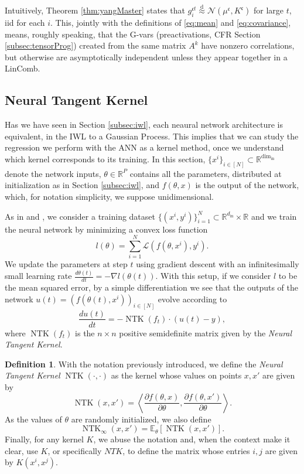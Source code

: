 \documentclass[11pt,notitlepage]{article}
\numberwithin{equation}{section}
\def\R{{\mathbb{R}}}
\def\normdist{\mathcal{N}}
\DeclareMathOperator{\NTK}{NTK}
\theoremstyle{remark}
\theoremstyle{definition}
\newtheorem{definition_body}[theorem]{Definition}
\newcommand{\definition}[1]{
	\theoremstyle{definition}
	\begin{definition_body}
		#1
	\end{definition_body}
	\theoremstyle{plain}
}
\begin{document}
	Intuitively, Theorem \ref{thm:yangMaster} states that $g_i^{\mathfrak{c}t} \stackrel{\text{d}}{\approx} \normdist(\mu^\mathfrak{c}, K^\mathfrak{c})$ for large $t$, iid for each $i$.
	This, jointly with the definitions of \eqref{eq:mean} and \eqref{eq:covariance}, means, roughly speaking, that the G-vars (preactivations, CFR Section \ref{subsec:tensorProg}) created from the same matrix $A^k$ have nonzero correlations, but otherwise are asymptotically independent unless they appear together in a LinComb.
	
	\subsection{Neural Tangent Kernel}\label{subsec:ntk}
	
	Has we have seen in Section \ref{subsec:iwl}, each neaural network architecture is equivalent, in the IWL to a Gaussian Process.
	This implies that we can study the regression we perform with the ANN as a kernel method, once we understand which kernel corresponds to its training.
	In this section, $\{x^i\}_{i\in [N]} \subset \R^{\text{dim}_\text{in}}$ denote the network inputs, $\theta \in \R^P$ contains all the parameters, distributed at initialization as in Section \ref{subsec:iwl}, and $f(\theta, x)$ is the output of the network, which, for notation simplicity, we suppose unidimensional.
	
	As in \cite{jacot2018neural} and \cite{arora2019exact}, we consider a training dataset $\{(x^i, y^i)\}_{i=1}^N \subset \R^{d_\text{in}} \times \R$ and we train the neural network by minimizing a convex loss function \[l(\theta) = \sum_{i=1}^N\mathcal{L}(f(\theta, x^i), y^i). \]
	We update the parameters at step $t$ using gradient descent with an infinitesimally small learning rate $\frac{d\theta(t)}{dt} = - \nabla l(\theta(t))$.
	With this setup, if we consider $l$ to be the mean squared error, by a simple differentiation \cite[Lemma 3.1]{arora2019exact} we see that the outputs of the network $u(t) = (f(\theta(t), x^i))_{i\in [N]}$ evolve according to 
	\begin{equation}\label{eq:dynamics}
		\frac{du(t)}{dt} = -\NTK(f_t) \cdot (u(t) - y),
	\end{equation}
	where $\NTK(f_t)$ is the $n \times n$ positive semidefinite matrix given by the \emph{Neural Tangent Kernel}.
	
	\definition{
		With the notation previously introduced, we define the \emph{Neural Tangent Kernel} $\NTK(\cdot, \cdot)$ as the kernel whose values on points $x, x'$ are given by 
		\begin{equation}\label{eq:ntk}
			\NTK(x, x') = \left\langle \frac{\partial f (\theta, x)}{\partial \theta}, \frac{\partial f (\theta, x')}{\partial \theta} \right\rangle. 
		\end{equation}
		As the values of $\theta$ are randomly initialized, we also define 
		\begin{equation}\label{eq:ntk_inf}
		\NTK_\infty(x, x') = \mathbb{E}_\theta [\NTK(x, x')].
		\end{equation}
		Finally, for any kernel $K$, we abuse the notation and, when the context make it clear, use $K$, or specifically $NTK$, to define the matrix whose entries $i,j$ are given by $K(x^i,x^j)$.
	}
	
\end{document}
